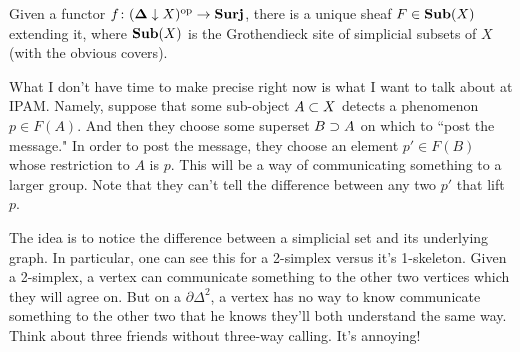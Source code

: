 \documentclass{amsart}
\def\bD{{\bf \Delta}}
\def\down{\downarrow}
\def\Surj{{\bf Surj}}
\def\Sub{{\bf Sub}}
\begin{document}
Given a functor $f\taking(\bD\down X)\op\to\Surj$, there is a unique sheaf $F\in\Sub(X)$ extending it, where $\Sub(X)$ is the Grothendieck site of simplicial subsets of $X$ (with the obvious covers).

What I don't have time to make precise right now is what I want to talk about at IPAM.  Namely, suppose that some sub-object $A\ss X$ detects a phenomenon $p\in F(A)$.  And then they choose some superset $B\superset A$ on which to ``post the message."  In order to post the message, they choose an element $p'\in F(B)$ whose restriction to $A$ is $p$.  This will be a way of communicating something to a larger group.  Note that they can't tell the difference between any two $p'$ that lift $p$.  

The idea is to notice the difference between a simplicial set and its underlying graph.  In particular, one can see this for a 2-simplex versus it's 1-skeleton.  Given a 2-simplex, a vertex can communicate something to the other two vertices which they will agree on.  But on a $\partial\Delta^2$, a vertex has no way to know communicate something to the other two that he knows they'll both understand the same way.  Think about three friends without three-way calling.  It's annoying!
\end{document}

